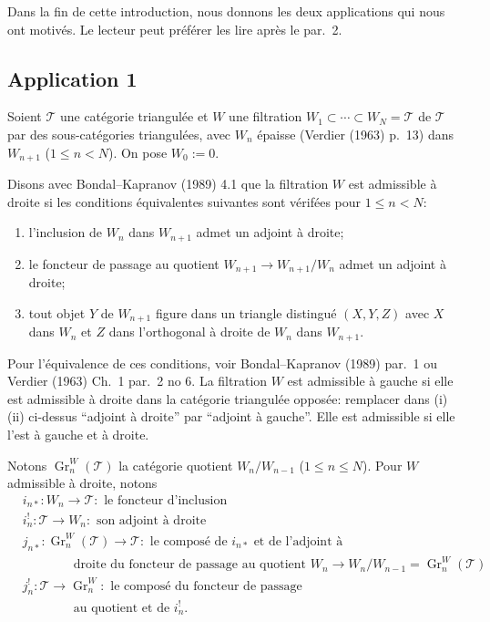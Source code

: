 \documentclass[11pt,a4paper]{article}
\theoremstyle{plain}
\theoremstyle{definition}
\DeclareMathOperator{\Gr}{Gr}
\newcommand{\cT}{\mathscr{T}}
\begin{document}
Dans la fin de cette introduction, nous donnons les deux applications qui nous ont motiv\'es. Le lecteur peut pr\'ef\'erer les lire apr\`es le par.~2.

\subsection*{Application 1}

Soient $\cT$ une cat\'egorie triangul\'ee et $W$ une filtration $W_1 \subset \cdots \subset W_N = \cT$ de $\cT$ par des sous-cat\'egories triangul\'ees, avec $W_n$ \'epaisse (Verdier (1963) p.~13) dans $W_{n+1}$ ($1 \leq n < N$). On pose $W_0 := 0$.

Disons avec Bondal--Kapranov (1989) 4.1 que la filtration $W$ est admissible \`a droite si les conditions \'equivalentes suivantes sont v\'erif\'ees pour $1 \leq n < N$:
\begin{enumerate}[label=(\roman*)]
\item l'inclusion de $W_n$ dans $W_{n+1}$ admet un adjoint \`a droite;
\item le foncteur de passage au quotient $W_{n+1} \to W_{n+1}/W_n$ admet un adjoint \`a droite;
\item tout objet $Y$ de $W_{n+1}$ figure dans un triangle distingu\'e $(X, Y, Z)$ avec $X$ dans $W_n$ et $Z$ dans l'orthogonal \`a droite de $W_n$ dans $W_{n+1}$.
\end{enumerate}
Pour l'\'equivalence de ces conditions, voir Bondal--Kapranov (1989) par.~1 ou Verdier (1963) Ch.~1 par.~2 no 6. La filtration $W$ est admissible \`a gauche si elle est admissible \`a droite dans la cat\'egorie triangul\'ee oppos\'ee: remplacer dans (i) (ii) ci-dessus ``adjoint \`a droite'' par ``adjoint \`a gauche''. Elle est admissible si elle l'est \`a gauche et \`a droite.

Notons $\Gr_n^W(\cT)$ la cat\'egorie quotient $W_n/W_{n-1}$ ($1 \leq n \leq N$). Pour $W$ admissible \`a droite, notons
\begin{align*}
&i_{n*} : W_n \to \cT : \text{ le foncteur d'inclusion} \\
&i_n^! : \cT \to W_n : \text{ son adjoint \`a droite} \\
&j_{n*} : \Gr_n^W(\cT) \to \cT : \text{ le compos\'e de } i_{n*} \text{ et de l'adjoint \`a} \\
&\qquad\qquad\text{droite du foncteur de passage au quotient } W_n \to W_n/W_{n-1} = \Gr_n^W(\cT) \\
&j_n^! : \cT \to \Gr_n^W : \text{ le compos\'e du foncteur de passage} \\
&\qquad\qquad\text{au quotient et de } i_n^!.
\end{align*}
\end{document}
